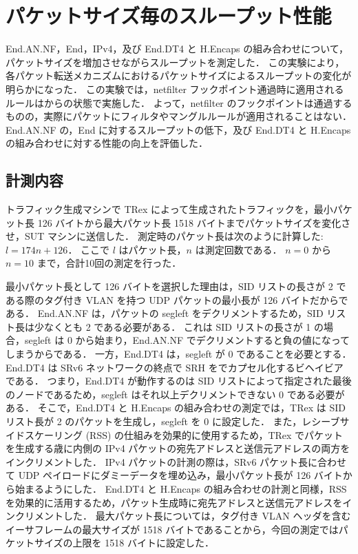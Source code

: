 \section{パケットサイズ毎のスループット性能}
\label{sec:eval.thru-size}
End.AN.NF，End，IPv4，及び End.DT4 と H.Encaps の組み合わせについて，パケットサイズを増加させながらスループットを測定した．
この実験により，各パケット転送メカニズムにおけるパケットサイズによるスループットの変化が明らかになった．
この実験では，netfilter フックポイント通過時に適用されるルールはからの状態で実施した．
よって，netfilter のフックポイントは通過するものの，実際にパケットにフィルタやマングルルールが適用されることはない．
End.AN.NF の，End に対するスループットの低下，及び End.DT4 と H.Encaps の組み合わせに対する性能の向上を評価した．

\subsection{計測内容}
\label{ssec:thru-size.summary}
トラフィック生成マシンで TRex によって生成されたトラフィックを，最小パケット長 126 バイトから最大パケット長 1518 バイトまでパケットサイズを変化させ，SUT マシンに送信した．
測定時のパケット長は次のように計算した: $l=174n+126$．
ここで $l$ はパケット長，$n$ は測定回数である．
$n=0$ から $n=10$ まで，合計10回の測定を行った．

最小パケット長として 126 バイトを選択した理由は，SID リストの長さが 2 である際のタグ付き VLAN を持つ UDP パケットの最小長が 126 バイトだからである．
End.AN.NF は，パケットの segleft をデクリメントするため，SID リスト長は少なくとも 2 である必要がある．
これは SID リストの長さが 1 の場合，segleft は 0 から始まり，End.AN.NF でデクリメントすると負の値になってしまうからである．
一方，End.DT4 は，segleft が 0 であることを必要とする．
End.DT4 は SRv6 ネットワークの終点で SRH をでカプセル化するビヘイビアである．
つまり，End.DT4 が動作するのは SID リストによって指定された最後のノードであるため，segleft はそれ以上デクリメントできない 0 である必要がある．
そこで，End.DT4 と H.Encaps の組み合わせの測定では，TRex は SID リスト長が 2 のパケットを生成し，segleft を 0 に設定した．
また，レシーブサイドスケーリング (RSS) の仕組みを効果的に使用するため，TRex でパケットを生成する歳に内側の IPv4 パケットの宛先アドレスと送信元アドレスの両方をインクリメントした．
IPv4 パケットの計測の際は，SRv6 パケット長に合わせて UDP ペイロードにダミーデータを埋め込み，最小パケット長が 126 バイトから始まるようにした．
End.DT4 と H.Encaps の組み合わせの計測と同様，RSS を効果的に活用するため，パケット生成時に宛先アドレスと送信元アドレスをインクリメントした．
最大パケット長については，タグ付き VLAN ヘッダを含むイーサフレームの最大サイズが 1518 バイトであることから，今回の測定ではパケットサイズの上限を 1518 バイトに設定した．

